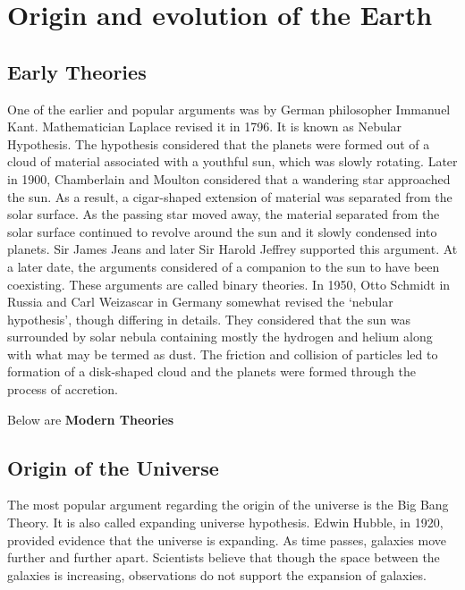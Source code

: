 \documentclass[8pt, a4paper, oneside, twocolumn]{extarticle}
\begin{document}
\section{Origin and evolution of the Earth}
\subsection{Early Theories}
One of the earlier and popular arguments was by German philosopher Immanuel Kant. Mathematician Laplace revised it in 1796. It is known as Nebular Hypothesis. The hypothesis considered that the planets were formed out of a cloud of material associated with a youthful sun, which was slowly rotating. Later in 1900, Chamberlain and Moulton considered that a wandering star approached the sun. As a result, a cigar-shaped extension of material was separated from the solar surface. As the passing star moved away, the material separated from the solar surface continued to revolve around the sun and it slowly condensed into planets. Sir James Jeans and later Sir Harold Jeffrey supported this argument. At a later date, the arguments considered of a companion to the sun to have been coexisting. These arguments are called binary theories. In 1950, Otto Schmidt in Russia and Carl Weizascar in Germany somewhat revised the ‘nebular hypothesis’, though differing in details. They considered that the sun was surrounded by solar nebula containing mostly the hydrogen and helium along with what may be termed as dust. The friction and collision of particles led to formation of a disk-shaped cloud and the planets were formed through the process of accretion.

Below are \textbf{Modern Theories}

\subsection{Origin of the Universe}

The most popular argument regarding the origin
of the universe is the Big Bang Theory. It is also called expanding universe hypothesis. Edwin Hubble, in 1920, provided evidence that the universe is expanding. As time passes, galaxies move further and further apart. Scientists believe that though the space between the galaxies is increasing, observations do not support the expansion of galaxies.
\end{document}
